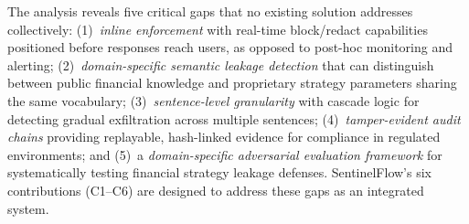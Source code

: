 \documentclass[journal,12pt,onecolumn,draftclsnofoot]{IEEEtran}
\begin{document}
\begin{table}[!ht]
    \centering
    \caption{Literature Gap Analysis: Existing Approaches vs.\ SentinelFlow Requirements}
    \label{tab:lit_gap}
\end{table}

The analysis reveals five critical gaps that no existing solution addresses collectively: (1)~\textit{inline enforcement} with real-time block/redact capabilities positioned before responses reach users, as opposed to post-hoc monitoring and alerting; (2)~\textit{domain-specific semantic leakage detection} that can distinguish between public financial knowledge and proprietary strategy parameters sharing the same vocabulary; (3)~\textit{sentence-level granularity} with cascade logic for detecting gradual exfiltration across multiple sentences; (4)~\textit{tamper-evident audit chains} providing replayable, hash-linked evidence for compliance in regulated environments; and (5)~a \textit{domain-specific adversarial evaluation framework} for systematically testing financial strategy leakage defenses. SentinelFlow's six contributions (C1--C6) are designed to address these gaps as an integrated system.
\end{document}
